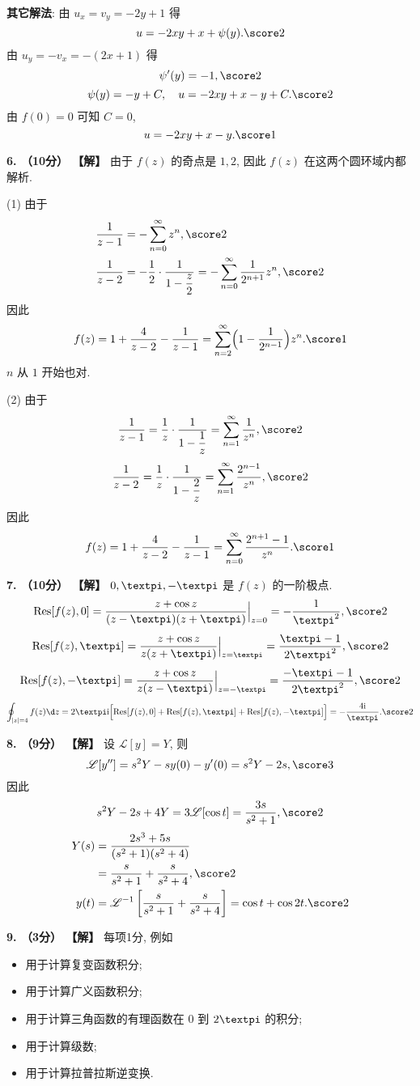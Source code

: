 \documentclass[simple]{hfutexam}
\DeclareMathOperator{\Res}{Res}
\newcommand\msl{\mathscr{L}}
\newcommand{\ii}{\mathrm{i}}
\newcommand{\cpi}{{\text{\textpi}}}
\begin{document}
\vspace{10pt}
\textbf{其它解法}: 由 $u_x=v_y=-2y+1$ 得
\[u=-2xy+x+\psi(y). \score2\]
由 $u_y=-v_x=-(2x+1)$ 得
\[\psi'(y)=-1, \score2\]
\[\psi(y)=-y+C,\quad u=-2xy+x-y+C. \score2\]
由 $f(0)=0$ 可知 $C=0$,
\[u=-2xy+x-y. \score1\]

\textbf{6. （10分） 【解】}
由于 $f(z)$ 的奇点是 $1,2$, 因此 $f(z)$ 在这两个圆环域内都解析.

(1)
由于
\begin{align*}
  \frac1{z-1}&=-\sum_{n=0}^\infty z^n, \score2\\
  \frac1{z-2}&=-\frac12\cdot\frac1{1-\dfrac z2}=-\sum_{n=0}^\infty \frac1{2^{n+1}}z^n, \score2
\end{align*}
因此
\[f(z)=1+\frac4{z-2}-\frac1{z-1}
=\sum_{n=2}^\infty \Bigl(1-\frac1{2^{n-1}}\Bigr){z^n}. \score1\]
$n$ 从 $1$ 开始也对.

(2) 
由于
\[\frac1{z-1}=\frac1z\cdot\frac1{1-\dfrac 1z}
=\sum_{n=1}^\infty \frac1{z^n}, \score2\]
\[\frac1{z-2}=\frac1z\cdot\frac1{1-\dfrac 2z}
=\sum_{n=1}^\infty \frac{2^{n-1}}{z^n}, \score2\]
因此
\[f(z)=1+\frac4{z-2}-\frac1{z-1}
=\sum_{n=0}^\infty \frac{2^{n+1}-1}{z^n}. \score1\]

\textbf{7. （10分） 【解】}
$0,\cpi,-\cpi$ 是 $f(z)$ 的一阶极点. 
\[\Res[f(z),0]=\frac{z+\cos z}{(z-\cpi)(z+\cpi)}\Big|_{z=0}=-\frac1{\cpi^2},\score2\]
\[\Res[f(z),\cpi]=\frac{z+\cos z}{z(z+\cpi)}\Big|_{z=\cpi}=\frac{\cpi-1}{2\cpi^2},\score2\]
\[\Res[f(z),-\cpi]=\frac{z+\cos z}{z(z-\cpi)}\Big|_{z=-\cpi}=\frac{-\cpi-1}{2\cpi^2},\score2\]
\[\oint_{|z|=4}f(z)\d z=2\cpi\ii\Bigl[\Res[f(z),0]+\Res[f(z),\cpi]+\Res[f(z),-\cpi]\Bigr]
=-\frac{4\ii}\cpi. \score2\]

\textbf{8. （9分） 【解】}
设 $\msl[y]=Y$, 则
\[\msl[y'']=s^2Y-sy(0)-y'(0)=s^2Y-2s, \score3\]
因此
\[s^2Y-2s+4Y=3\msl[\cos t]=\frac{3s}{s^2+1}, \score2\]
\begin{align*}
Y(s)&
=\frac{2s^3+5s}{(s^2+1)(s^2+4)}\\&
=\frac s{s^2+1}+\frac s{s^2+4}, \score2\\
y(t)&
=\msl^{-1}\left[\frac s{s^2+1}+\frac s{s^2+4}\right]
=\cos t+\cos 2t. \score2
\end{align*}

\textbf{9. （3分） 【解】}
每项1分, 例如
\begin{itemize}
  \item 用于计算复变函数积分;
  \item 用于计算广义函数积分;
  \item 用于计算三角函数的有理函数在 $0$ 到 $2\cpi$ 的积分;
  \item 用于计算级数;
  \item 用于计算拉普拉斯逆变换.
\end{itemize}
\end{document}
